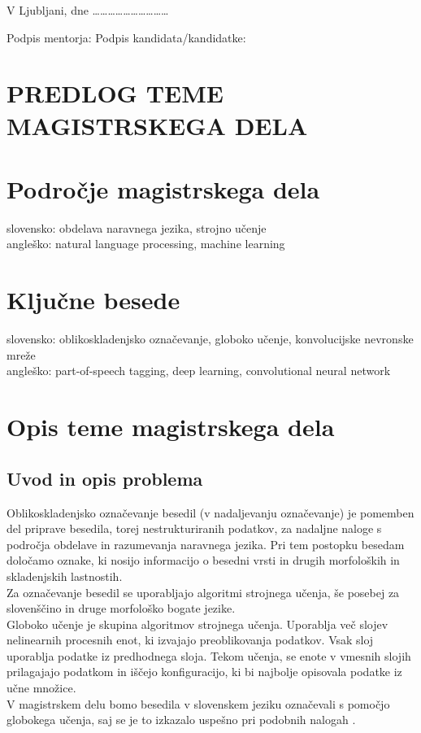\documentclass[a4paper, 12pt]{article}
\begin{document}
V Ljubljani, dne …………………………

Podpis mentorja: \hspace{180px} Podpis kandidata/kandidatke:


\clearpage
\section*{PREDLOG TEME MAGISTRSKEGA DELA}

\section{Področje magistrskega dela}

slovensko: obdelava naravnega jezika, strojno učenje\\
angleško: natural language processing, machine learning


\section{Ključne besede}

slovensko: oblikoskladenjsko označevanje, globoko učenje, konvolucijske nevronske mreže\\
angleško: part-of-speech tagging, deep learning, convolutional neural network


\section{Opis teme magistrskega dela}

\subsection{Uvod in opis problema}

Oblikoskladenjsko označevanje besedil (v nadaljevanju označevanje) je pomemben del priprave besedila, torej nestrukturiranih podatkov, za nadaljne naloge s področja obdelave in razumevanja naravnega jezika. Pri tem postopku besedam določamo oznake, ki nosijo informacijo o besedni vrsti in drugih morfoloških in skladenjskih lastnostih.\\
Za označevanje besedil se uporabljajo algoritmi strojnega učenja, še posebej za slovenščino in druge morfološko bogate jezike.\\
Globoko učenje je skupina algoritmov strojnega učenja. Uporablja več slojev nelinearnih procesnih enot, ki izvajajo preoblikovanja podatkov. Vsak sloj uporablja podatke iz predhodnega sloja. Tekom učenja, se enote v vmesnih slojih prilagajajo podatkom in iščejo konfiguracijo, ki bi najbolje opisovala podatke iz učne množice.\\
V magistrskem delu bomo besedila v slovenskem jeziku označevali s pomočjo globokega učenja, saj se je to izkazalo uspešno pri podobnih nalogah \cite{Santos2014,Labeau2015,Kim2016}.
\end{document}
